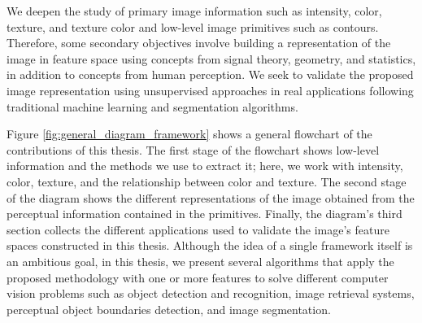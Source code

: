 %
We deepen the study of primary image information such as intensity, color, texture, and texture color and low-level image primitives such as contours. Therefore, some secondary objectives involve building a representation of the image in feature space using concepts from signal theory, geometry, and statistics, in addition to concepts from human perception. We seek to validate the proposed image representation using unsupervised approaches in real applications following traditional machine learning and segmentation algorithms.

Figure \ref{fig:general_diagram_framework} shows a general flowchart of the contributions of this thesis. The first stage of the flowchart shows low-level information and the methods we use to extract it; here, we work with intensity, color, texture, and the relationship between color and texture. The second stage of the diagram shows the different representations of the image obtained from the perceptual information contained in the primitives. Finally, the diagram's third section collects the different applications used to validate the image's feature spaces constructed in this thesis. Although the idea of a single framework itself is an ambitious goal, in this thesis, we present several algorithms that apply the proposed methodology with one or more features to solve different computer vision problems such as object detection and recognition, image retrieval systems, perceptual object boundaries detection, and image segmentation.

